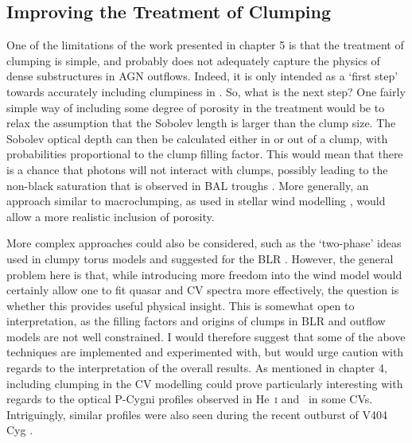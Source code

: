 \subsection{Improving the Treatment of Clumping}
One of the limitations of the work presented in chapter 5 is that the
treatment of clumping is simple, and probably does not adequately capture the
physics of dense substructures in AGN outflows. 
Indeed, it is only intended as a `first step' towards
accurately including clumpiness in \py. So, what is the next step? One fairly 
simple way of including some degree of porosity in the treatment would 
be to relax the assumption that the Sobolev length is larger than the
clump size. The Sobolev optical depth can then be calculated either
in or out of a clump, with probabilities proportional
to the clump filling factor. This would mean that there is a chance 
that photons will not interact with clumps, possibly leading to
the non-black saturation that is observed in BAL troughs
\citep[][see also section~\ref{sec:balqso_angles}]{arav1999b,arav1999a}.
More generally, an approach similar to macroclumping, as 
used in stellar wind modelling \citep[e.g.][]{hamann2008,surlan2012},
would allow a more realistic inclusion of porosity.

More complex approaches could also be considered, 
such as the `two-phase' ideas used in clumpy torus models 
\citep{stalevski2013} and suggested for the BLR 
\citep[e.g.][]{netzer1990, dekool1995, elvis2000}.
However, the general problem here is that, while introducing more freedom into 
the wind model would certainly allow one to fit quasar and CV spectra
more effectively, the question is whether this provides useful physical insight.
This is somewhat open to interpretation, as the filling factors and origins of clumps
in BLR and outflow models are not well constrained. I would therefore suggest that
some of the above techniques are implemented and experimented with,
but would urge caution with regards to the interpretation of the overall
results. As mentioned in chapter 4, including clumping in the CV modelling
could prove particularly interesting with regards to the optical P-Cygni profiles 
observed in He~\textsc{i} and \ha\ in some CVs. 
Intriguingly, similar profiles were also 
seen during the recent outburst of V404 Cyg \citep{munozdarias2016}.

